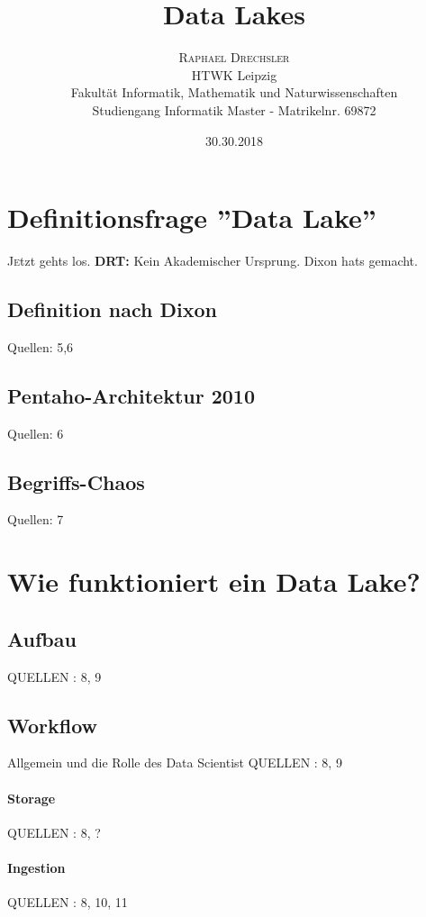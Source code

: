 \documentclass[twoside,twocolumn]{article}
\title{Data Lakes} %
\author{%
\textsc{Raphael Drechsler}\\[1ex] %
\normalsize HTWK Leipzig \\ 
\normalsize Fakultät Informatik, Mathematik und Naturwissenschaften\\ 
\normalsize Studiengang Informatik Master - Matrikelnr. 69872\\%
}
\date{30.30.2018} %
\begin{document}
\maketitle


\section{Definitionsfrage ''Data Lake''}
\lettrine[nindent=0em,lines=2]{J} etzt gehts los.
\textbf{DRT:}
Kein Akademischer Ursprung. Dixon hats gemacht.
\cite{src1}
\cite{src2}
\cite{src3}
\cite{src4}
\cite{src5}
\cite{src6}
\cite{src7}
\cite{src8}
\cite{src9}
\cite{src10}
\cite{src11}
\cite{src12}
\cite{src13}
\cite{src14}
\cite{src15}

\subsection{Definition nach Dixon}
Quellen: 5,6
\subsection{Pentaho-Architektur 2010}
Quellen: 6
\subsection{Begriffs-Chaos}
Quellen: 7

\section{Wie funktioniert ein Data Lake?}
\subsection{Aufbau}
QUELLEN : 8, 9
\subsection{Workflow}
Allgemein und die Rolle des Data Scientist
QUELLEN : 8, 9
\paragraph{Storage}
QUELLEN : 8, ?
\paragraph{Ingestion}
QUELLEN : 8, 10, 11
\end{document}
